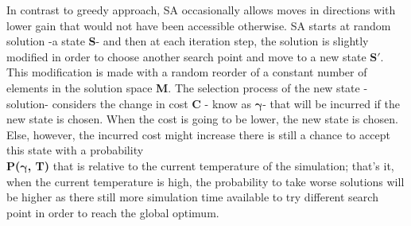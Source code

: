 \documentclass[twocolumn]{article}
\begin{document}
	 In contrast to greedy approach, SA occasionally allows moves in directions with lower gain that would not have been accessible otherwise. SA starts at random solution -a state {\bfseries S}- and then at each iteration step, the solution is slightly modified in order to choose another search point and move to a new state $\boldsymbol{S\prime}$. This modification is made with a random reorder of a constant number of elements in the solution space {\bfseries M}. The selection process of the new state -solution- considers the change in cost {\bfseries C} - know as {$\boldsymbol \gamma$}- that will be incurred if the new state is chosen. When the cost is going to be lower, the new state is chosen. Else, however, the incurred cost might increase there is still a chance to accept this state with a probability \\{\bfseries P({$\boldsymbol \gamma$}, T)} that is relative to the current temperature of the simulation; that's it, when the current temperature is high, the probability to take worse solutions will be higher as there still more simulation time available to try different search point in order to reach the global optimum.
	 
\end{document}
